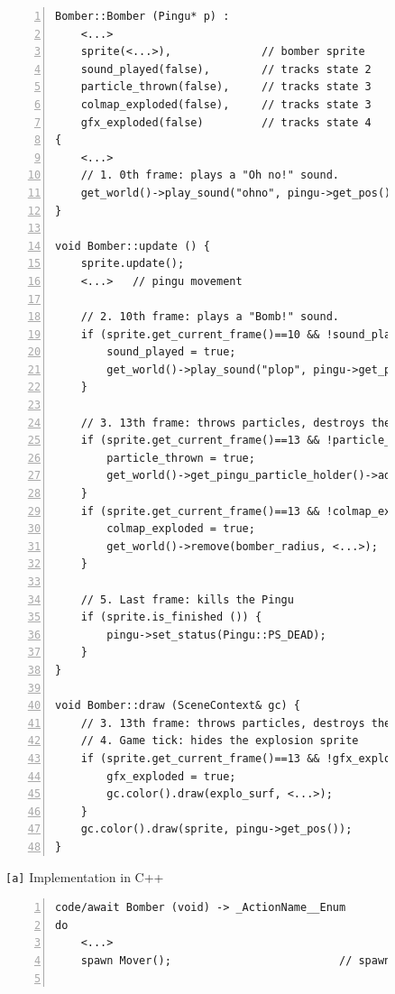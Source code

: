 \documentclass{vgtc}                          %
\newcommand{\code}[1] {{\small{\texttt{#1}}}}
\newcommand{\ax}{\code{[a]}\xspace}
\begin{document}
\begin{figure}[t]
\begin{minipage}[t]{0.55\linewidth}
\begin{lstlisting}[numbers=left,xleftmargin=3em]
Bomber::Bomber (Pingu* p) :
    <...>
    sprite(<...>),              // bomber sprite
    sound_played(false),        // tracks state 2               @def_1
    particle_thrown(false),     // tracks state 3
    colmap_exploded(false),     // tracks state 3
    gfx_exploded(false)         // tracks state 4               @def_2
{
    <...>
    // 1. 0th frame: plays a "Oh no!" sound.
    get_world()->play_sound("ohno", pingu->get_pos());          @sound_ohno
}

void Bomber::update () {                                        @update_ini
    sprite.update();                                            @update_1
    <...>   // pingu movement                                   @update_2

    // 2. 10th frame: plays a "Bomb!" sound.                    @sound_bomb_1
    if (sprite.get_current_frame()==10 && !sound_played) {
        sound_played = true;
        get_world()->play_sound("plop", pingu->get_pos());
    }                                                           @sound_bomb_2

    // 3. 13th frame: throws particles, destroys the terrain, shows an explosion sprite
    if (sprite.get_current_frame()==13 && !particle_thrown) {   @state_3_1
        particle_thrown = true;
        get_world()->get_pingu_particle_holder()->add_particle(...);
    }
    if (sprite.get_current_frame()==13 && !colmap_exploded) {
        colmap_exploded = true;
        get_world()->remove(bomber_radius, <...>);
    }                                                           @state_3_2

    // 5. Last frame: kills the Pingu
    if (sprite.is_finished ()) {                                @die_1
        pingu->set_status(Pingu::PS_DEAD);
    }                                                           @die_2
}                                                               @update_end

void Bomber::draw (SceneContext& gc) {
    // 3. 13th frame: throws particles, destroys the terrain, shows an explosion sprite
    // 4. Game tick: hides the explosion sprite
    if (sprite.get_current_frame()==13 && !gfx_exploded) {      @state_3_3
        gfx_exploded = true;                                    @state_3_4
        gc.color().draw(explo_surf, <...>);                     @state_4
    }
    gc.color().draw(sprite, pingu->get_pos());
}
\end{lstlisting}
\centering\small{\ax Implementation in C++}
\end{minipage}
%
\begin{minipage}[t]{0.45\linewidth}
\begin{lstlisting}[numbers=left,xleftmargin=3em]
code/await Bomber (void) -> _ActionName__Enum
do
    <...>
    spawn Mover();                          // spawn the pingu movement to execute in the "background"      @move


\end{lstlisting}
\end{minipage}
\end{figure}
\end{document}
